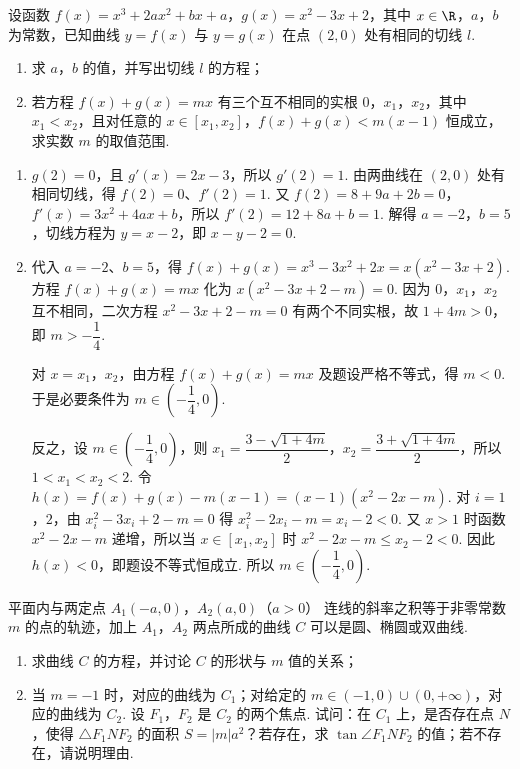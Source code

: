 \begin{problem}
设函数 \( f(x) = x^{3} + 2ax^{2} + bx + a \)，\( g(x) = x^{2} - 3x + 2 \)，其中 \( x \in \R \)，\(a\)，\(b\) 为常数，已知曲线 \( y = f(x) \) 与 \( y = g(x) \) 在点 \((2,0)\) 处有相同的切线 \( l \).
\begin{enumerate}
\item 求 \(a\)，\(b\) 的值，并写出切线 \(l\) 的方程；
\item 若方程 \( f(x) + g(x) = mx \) 有三个互不相同的实根 \(0\)，\(x_1\)，\(x_2\)，其中 \( x_1 < x_2 \)，且对任意的 \( x \in [x_1, x_2] \)，\( f(x) + g(x) < m (x - 1) \) 恒成立，求实数 \( m \) 的取值范围.
\end{enumerate}
\end{problem}

\begin{solution}
\begin{enumerate}
\item \(g(2)=0\)，且 \(g'(x)=2x-3\)，所以 \(g'(2)=1\). 由两曲线在 \((2,0)\) 处有相同切线，得 \(f(2)=0\)、\(f'(2)=1\). 又
\(f(2)=8+9a+2b=0\)，\(f'(x)=3x^2+4ax+b\)，所以 \(f'(2)=12+8a+b=1\). 解得 \(a=-2\)，\(b=5\)，切线方程为 \(y=x-2\)，即 \(x-y-2=0\).
\item 代入 \(a=-2\)、\(b=5\)，得
\(f(x)+g(x)=x^3-3x^2+2x=x(x^2-3x+2)\). 方程 \(f(x)+g(x)=mx\) 化为
\(x\left(x^2-3x+2-m\right)=0\). 因为 \(0\)，\(x_1\)，\(x_2\) 互不相同，二次方程 \(x^2-3x+2-m=0\) 有两个不同实根，故
\(1+4m>0\)，即 \(m>-\dfrac14\).

对 \(x=x_1\)，\(x_2\)，由方程 \(f(x)+g(x)=mx\) 及题设严格不等式，得 \(m<0\). 于是必要条件为 \(m\in\left(-\dfrac14,0\right)\).

反之，设 \(m\in\left(-\dfrac14,0\right)\)，则
\(x_1=\dfrac{3-\sqrt{1+4m}}2\)，\(x_2=\dfrac{3+\sqrt{1+4m}}2\)，所以 \(1<x_1<x_2<2\). 令
\(h(x)=f(x)+g(x)-m(x-1)=(x-1)(x^2-2x-m)\). 对 \(i=1\)，\(2\)，由 \(x_i^2-3x_i+2-m=0\) 得
\(x_i^2-2x_i-m=x_i-2<0\). 又 \(x>1\) 时函数 \(x^2-2x-m\) 递增，所以当 \(x\in[x_1,x_2]\) 时
\(x^2-2x-m\leqslant x_2-2<0\). 因此 \(h(x)<0\)，即题设不等式恒成立. 所以
\(m\in\left(-\dfrac14,0\right)\).
\end{enumerate}
\end{solution}

\begin{problem}
平面内与两定点 \(A_{1}(-a,0)\)，\(A_{2}(a,0) \)（\(a > 0\)） 连线的斜率之积等于非零常数 \(m\) 的点的轨迹，加上 \(A_{1}\)，\(A_{2}\) 两点所成的曲线 \(C\) 可以是圆、椭圆或双曲线.
\begin{enumerate}
\item 求曲线 \(C\) 的方程，并讨论 \(C\) 的形状与 \(m\) 值的关系；
\item 当 \(m = -1\) 时，对应的曲线为 \(C_1\)；对给定的 \(m \in (-1,0) \cup (0,+\infty)\)，对应的曲线为 \(C_2\). 设 \(F_1\)，\(F_2\) 是 \(C_2\) 的两个焦点. 试问：在 \(C_1\) 上，是否存在点 \(N\)，使得 \(\triangle F_1NF_2\) 的面积 \(S = |m|a^2\)？若存在，求 \(\tan \angle F_1NF_2\) 的值；若不存在，请说明理由.
\end{enumerate}
\end{problem}

